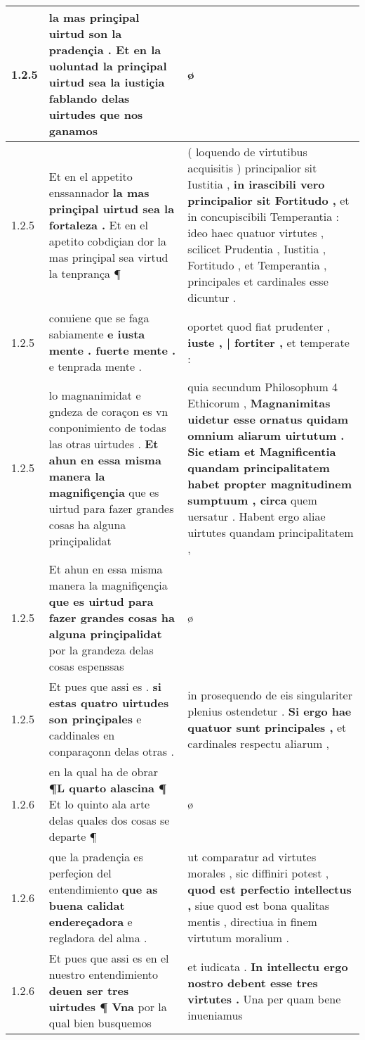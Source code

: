 \begin{tabular}{|p{1cm}|p{6.5cm}|p{6.5cm}|}
1.2.5 & la mas prinçipal uirtud son la pradençia . \textbf{ Et en la uoluntad la prinçipal uirtud sea la iustiçia fablando delas uirtudes } que nos ganamos & ø \\\hline
1.2.5 & Et en el appetito enssannador \textbf{ la mas prinçipal uirtud sea la fortaleza . } Et en el apetito cobdiçian dor la mas prinçipal sea virtud la tenprança ¶ & ( loquendo de virtutibus acquisitis ) principalior sit Iustitia , \textbf{ in irascibili vero principalior sit Fortitudo , } et in concupiscibili Temperantia : ideo haec quatuor virtutes , scilicet Prudentia , Iustitia , Fortitudo , et Temperantia , principales et cardinales esse dicuntur . \\\hline
1.2.5 & conuiene que se faga sabiamente \textbf{ e iusta mente . fuerte mente . } e tenprada mente . & oportet quod fiat prudenter , \textbf{ iuste , | fortiter , } et temperate : \\\hline
1.2.5 & lo magnanimidat e gndeza de coraçon es vn conponimiento de todas las otras uirtudes . \textbf{ Et ahun en essa misma manera la magnifiçençia } que es uirtud para fazer grandes cosas ha alguna prinçipalidat & quia secundum Philosophum 4 Ethicorum , \textbf{ Magnanimitas uidetur esse ornatus quidam omnium aliarum uirtutum . Sic etiam et Magnificentia quandam principalitatem habet propter magnitudinem sumptuum , circa } quem uersatur . Habent ergo aliae uirtutes quandam principalitatem , \\\hline
1.2.5 & Et ahun en essa misma manera la magnifiçençia \textbf{ que es uirtud para fazer grandes cosas ha alguna prinçipalidat } por la grandeza delas cosas espenssas & ø \\\hline
1.2.5 & Et pues que assi es . \textbf{ si estas quatro uirtudes son prinçipales } e caddinales en conparaçonn delas otras . & in prosequendo de eis singulariter plenius ostendetur . \textbf{ Si ergo hae quatuor sunt principales , } et cardinales respectu aliarum , \\\hline
1.2.6 & en la qual ha de obrar \textbf{ ¶L quarto alascina ¶ } Et lo quinto ala arte delas quales dos cosas se departe ¶ & ø \\\hline
1.2.6 & que la pradençia es perfeçion del entendimiento \textbf{ que as buena calidat endereçadora } e regladora del alma . & ut comparatur ad virtutes morales , sic diffiniri potest , \textbf{ quod est perfectio intellectus , } siue quod est bona qualitas mentis , directiua in finem virtutum moralium . \\\hline
1.2.6 & Et pues que assi es en el nuestro entendimiento \textbf{ deuen ser tres uirtudes ¶ Vna } por la qual bien busquemos & et iudicata . \textbf{ In intellectu ergo nostro debent esse tres virtutes . } Una per quam bene inueniamus \\\hline

\end{tabular}
